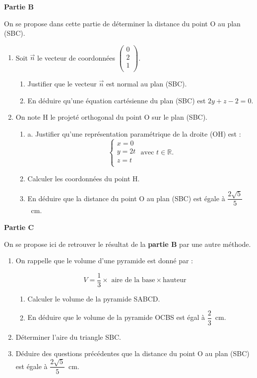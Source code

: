 \documentclass[10pt]{article}
\providecommand{\R}{\mathbb{R}}
\providecommand{\vect}[1]{\overrightarrow{#1}}
\begin{document}
\textbf{Partie B}

On se propose dans cette partie de déterminer la distance du point O au plan (SBC).

\begin{enumerate}
\item Soit $\vect{n}$ le vecteur de coordonnées $\begin{pmatrix} 0\\ 2\\ 1\\ \end{pmatrix}$.
	\begin{enumerate}
		\item Justifier que le vecteur $\vect{n}$ est normal au plan (SBC).
		\item En déduire qu'une équation cartésienne du plan (SBC) est \quad $2 y+z-2=0$.
	\end{enumerate}
	\item On note H le projeté orthogonal du point O sur le plan (SBC).
		\begin{enumerate}
			\item a. Justifier qu'une représentation paramétrique de la droite (OH) est :
			\[\begin{cases}
			x =0\\
			y =2t\\
			z =t\\
			\end{cases}\text{ avec } t \in \R.\]
			\item Calculer les coordonnées du point H.
			\item En déduire que la distance du point O au plan (SBC) est égale à $\dfrac{2 \sqrt{5}}{5}$~cm.
		\end{enumerate}
	\end{enumerate}

\textbf{Partie C}

On se propose ici de retrouver le résultat de la \textbf{partie B} par une autre méthode.

\begin{enumerate}
\item On rappelle que le volume d'une pyramide est donné par :

\[V =\dfrac{1}{3} \times \text{ aire de la base} \times \text{hauteur}\]

	\begin{enumerate}
		\item Calculer le volume de la pyramide SABCD.
		\item En déduire que le volume de la pyramide OCBS est égal à $\dfrac{2}{3}$~cm.
	\end{enumerate}
\item Déterminer l'aire du triangle SBC.
\item Déduire des questions précédentes que la distance du point O au plan (SBC) est égale à $\dfrac{2 \sqrt{5}}{5}$~cm.
\end{enumerate}
\end{document}
